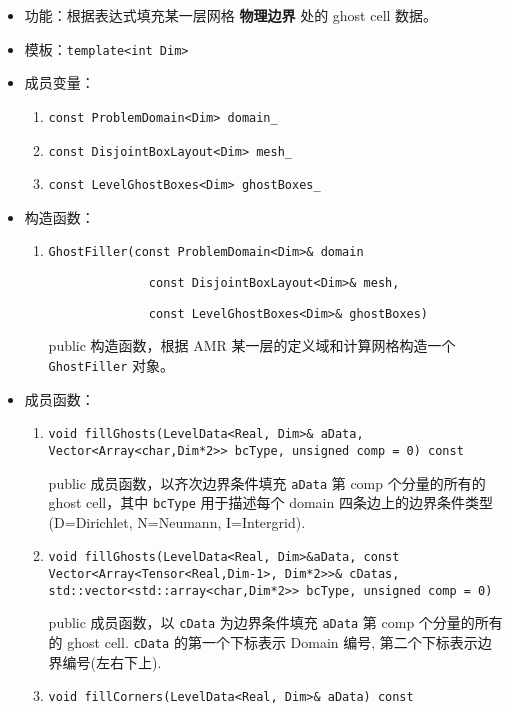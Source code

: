 \documentclass[cn, bibend=bibtex]{elegantpaper}
\theoremstyle{plain}
\begin{document}
\begin{itemize}
  \item 功能：根据表达式填充某一层网格 \textbf{物理边界} 处的 ghost cell 数据。
  \item 模板：\lstinline|template<int Dim>|
  \item 成员变量：
  \begin{enumerate}
    \item \lstinline|const ProblemDomain<Dim> domain_|
    \item \lstinline|const DisjointBoxLayout<Dim> mesh_|
    \item \lstinline|const LevelGhostBoxes<Dim> ghostBoxes_|
  \end{enumerate}
  \item 构造函数：
  \begin{enumerate}
    \item \lstinline|GhostFiller(const ProblemDomain<Dim>& domain|
    
          \lstinline|              const DisjointBoxLayout<Dim>& mesh,|
    
          \lstinline|              const LevelGhostBoxes<Dim>& ghostBoxes)|

    public 构造函数，根据 AMR 某一层的定义域和计算网格构造一个 \lstinline|GhostFiller| 对象。
  \end{enumerate}
  \item 成员函数：
  \begin{enumerate}
    \item \lstinline|void fillGhosts(LevelData<Real, Dim>& aData, Vector<Array<char,Dim*2>> bcType, unsigned comp = 0) const|

    public 成员函数，以齐次边界条件填充 \lstinline|aData| 第 comp 个分量的所有的 ghost cell，其中
    \lstinline|bcType| 用于描述每个 domain 四条边上的边界条件类型 (D=Dirichlet, N=Neumann, I=Intergrid).
    \item \lstinline|void fillGhosts(LevelData<Real, Dim>&aData, const Vector<Array<Tensor<Real,Dim-1>, Dim*2>>& cDatas, std::vector<std::array<char,Dim*2>> bcType, unsigned comp = 0)|

    public 成员函数，以 \lstinline|cData| 为边界条件填充 \lstinline|aData| 第 comp 个分量的所有的 ghost cell. 
    \lstinline|cData| 的第一个下标表示 Domain 编号, 第二个下标表示边界编号(左右下上).

    \item \lstinline|void fillCorners(LevelData<Real, Dim>& aData) const|


\end{enumerate}
\end{itemize}
\end{document}
